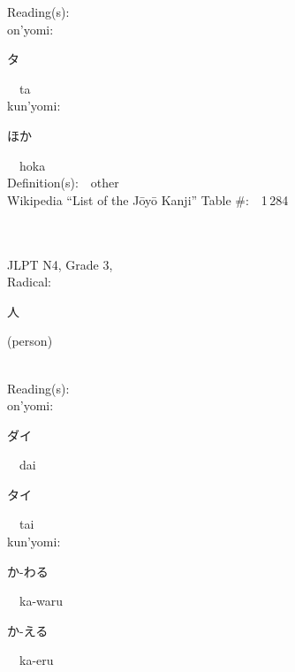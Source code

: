 \begin{multicols}{2}
Reading(s):\ \ \\
{\hspace*{1em}}on'yomi:\ \ \\
{\hspace*{2em}}{\begin{CJK}{UTF8}{min} タ \end{CJK}}\ \ ta\ \ \\
{\hspace*{1em}}kun'yomi:\ \ \\
{\hspace*{2em}}{\begin{CJK}{UTF8}{min} ほか \end{CJK}}\ \ hoka\ \ \\
Definition(s):\ \ other \\
Wikipedia ``List of the J\=oy\=o Kanji'' Table \#:\ \ 1\,284 \\
\ \ \\
{\fontsize{34pt}{40pt}  }\ \ \\  %
{JLPT N4, Grade 3, \\Radical:\ \ {\begin{CJK}{UTF8}{min} 人 \end{CJK}} (person) } \\
Reading(s):\ \ \\
{\hspace*{1em}}on'yomi:\ \ \\
{\hspace*{2em}}{\begin{CJK}{UTF8}{min} ダイ \end{CJK}}\ \ dai\ \ \\
{\hspace*{2em}}{\begin{CJK}{UTF8}{min} タイ \end{CJK}}\ \ tai\ \ \\
{\hspace*{1em}}kun'yomi:\ \ \\
{\hspace*{2em}}{\begin{CJK}{UTF8}{min} か-わる \end{CJK}}\ \ ka-waru\ \ \\
{\hspace*{2em}}{\begin{CJK}{UTF8}{min} か-える \end{CJK}}\ \ ka-eru\ \ \\

\end{multicols}

